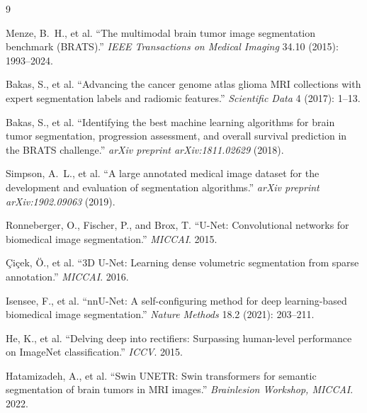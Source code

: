 \documentclass[10pt,twocolumn]{article}
\begin{document}
\begin{thebibliography}{9}

Menze, B.~H., et al. ``The multimodal brain tumor image
segmentation benchmark (BRATS).''
\textit{IEEE Transactions on Medical Imaging} 34.10 (2015):
1993--2024.

Bakas, S., et al. ``Advancing the cancer genome atlas glioma
MRI collections with expert segmentation labels and radiomic
features.'' \textit{Scientific Data} 4 (2017): 1--13.

Bakas, S., et al. ``Identifying the best machine learning
algorithms for brain tumor segmentation, progression
assessment, and overall survival prediction in the BRATS
challenge.'' \textit{arXiv preprint arXiv:1811.02629} (2018).

Simpson, A.~L., et al. ``A large annotated medical image
dataset for the development and evaluation of segmentation
algorithms.'' \textit{arXiv preprint arXiv:1902.09063} (2019).

Ronneberger, O., Fischer, P., and Brox, T. ``U-Net:
Convolutional networks for biomedical image segmentation.''
\textit{MICCAI}. 2015.

{\c{C}}i{\c{c}}ek, {\"O}., et al. ``3D U-Net: Learning dense
volumetric segmentation from sparse annotation.''
\textit{MICCAI}. 2016.

Isensee, F., et al. ``nnU-Net: A self-configuring method for
deep learning-based biomedical image segmentation.''
\textit{Nature Methods} 18.2 (2021): 203--211.

He, K., et al. ``Delving deep into rectifiers: Surpassing
human-level performance on ImageNet classification.''
\textit{ICCV}. 2015.

Hatamizadeh, A., et al. ``Swin UNETR: Swin transformers for
semantic segmentation of brain tumors in MRI images.''
\textit{Brainlesion Workshop, MICCAI}. 2022.

\end{thebibliography}
\end{document}

